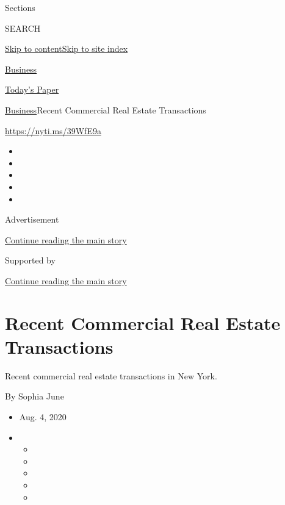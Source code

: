 Sections

SEARCH

\protect\hyperlink{site-content}{Skip to
content}\protect\hyperlink{site-index}{Skip to site index}

\href{https://www.nytimes3xbfgragh.onion/section/business}{Business}

\href{https://myaccount.nytimes3xbfgragh.onion/auth/login?response_type=cookie\&client_id=vi}{}

\href{https://www.nytimes3xbfgragh.onion/section/todayspaper}{Today's
Paper}

\href{/section/business}{Business}\textbar{}Recent Commercial Real
Estate Transactions

\url{https://nyti.ms/39WfE9a}

\begin{itemize}
\item
\item
\item
\item
\item
\end{itemize}

Advertisement

\protect\hyperlink{after-top}{Continue reading the main story}

Supported by

\protect\hyperlink{after-sponsor}{Continue reading the main story}

\hypertarget{recent-commercial-real-estate-transactions}{%
\section{Recent Commercial Real Estate
Transactions}\label{recent-commercial-real-estate-transactions}}

Recent commercial real estate transactions in New York.

By Sophia June

\begin{itemize}
\item
  Aug. 4, 2020
\item
  \begin{itemize}
  \item
  \item
  \item
  \item
  \item
  \end{itemize}
\end{itemize}

